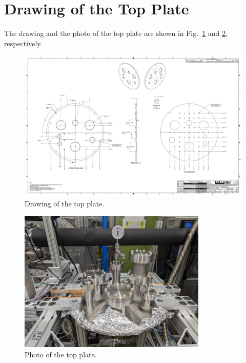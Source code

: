 \section{Drawing of the Top Plate}
\label{app:top_plate_drawing}

The drawing and the photo of the top plate are shown in Fig.~\ref{fig:top_plate}
and \ref{fig:top_plate_photo}, respectively.

\begin{figure}[h]
    \centering
    \includegraphics[width=\textwidth]{fig/TopPlate.pdf}
    \caption{Drawing of the top plate.}
    \label{fig:top_plate}
\end{figure}

\begin{figure}[h]
    \centering
    \includegraphics[width=0.8\textwidth]{fig/TopPlate_Photo.jpg}
    \caption{Photo of the top plate.}
    \label{fig:top_plate_photo}
\end{figure}
